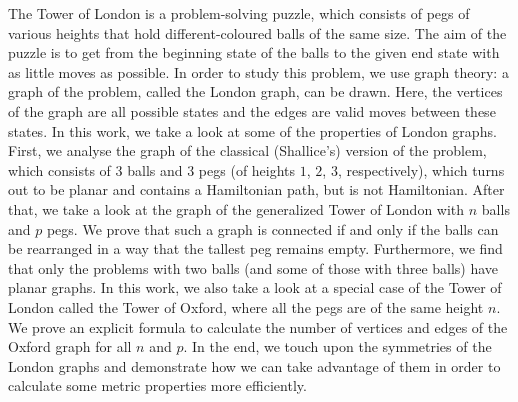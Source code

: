 \documentclass[12pt,a4paper]{amsart}
\begin{document}
The Tower of London is a problem-solving puzzle, which consists of pegs of various heights that hold different-coloured balls of the same size. The aim of the puzzle is to get from the beginning state of the balls to the given end state with as little moves as possible. In order to study this problem, we use graph theory: a graph of the problem, called the London graph, can be drawn. Here, the vertices of the graph are all possible states and the edges are valid moves between these states. In this work, we take a look at some of the properties of London graphs. First, we analyse the graph of the classical (Shallice's) version of the problem, which consists of $3$ balls and $3$ pegs (of heights $1$, $2$, $3$, respectively), which turns out to be planar and contains a Hamiltonian path, but is not Hamiltonian.
After that, we take a look at the graph of the generalized Tower of London with $n$ balls and $p$ pegs. We prove that such a graph is connected if and only if the balls can be rearranged in a way that the tallest peg remains empty. Furthermore, we find that only  the problems with two balls (and some of those with three balls) have planar graphs. In this work, we also take a look at a special case of the Tower of London called the Tower of Oxford, where all the pegs are of the same height $n$. We prove an explicit formula to calculate the number of vertices and edges of the Oxford graph for all $n$ and $p$. In the end, we touch upon the symmetries of the London graphs and demonstrate how we can take advantage of them in order to calculate some metric properties more efficiently.
\vfill\noindent
\end{document}
